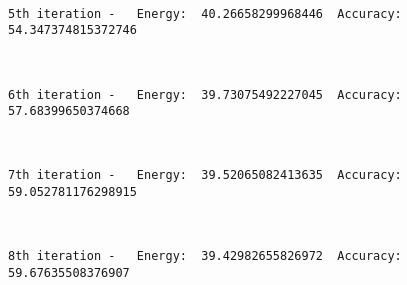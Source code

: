 \documentclass[11pt]{article}
\begin{document}
    \begin{center}
    \end{center}
    { \hspace*{\fill} \\}
    
    \begin{Verbatim}[commandchars=\\\{\}]
5th iteration -   Energy:  40.26658299968446  Accuracy:  54.347374815372746

    \end{Verbatim}

    \begin{center}
    \end{center}
    { \hspace*{\fill} \\}
    
    \begin{Verbatim}[commandchars=\\\{\}]
6th iteration -   Energy:  39.73075492227045  Accuracy:  57.68399650374668

    \end{Verbatim}

    \begin{center}
    \end{center}
    { \hspace*{\fill} \\}
    
    \begin{Verbatim}[commandchars=\\\{\}]
7th iteration -   Energy:  39.52065082413635  Accuracy:  59.052781176298915

    \end{Verbatim}

    \begin{center}
    \end{center}
    { \hspace*{\fill} \\}
    
    \begin{Verbatim}[commandchars=\\\{\}]
8th iteration -   Energy:  39.42982655826972  Accuracy:  59.67635508376907

    \end{Verbatim}
\end{document}
